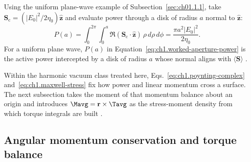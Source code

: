 Using the uniform plane-wave example of Subsection~\ref{sec:ch01.1.1}, take $\mathbf{S}_\mathrm{c}=(|E_0|^2/2\eta_0)\hat{\mathbf{z}}$
and evaluate power through a disk of radius $a$ normal to $\hat{\mathbf{z}}$:
\begin{equation}
\label{eq:ch1.worked-aperture-power}
P(a)=\int_0^{2\pi}\!\!\int_0^a \Re(\mathbf{S}_\mathrm{c}\cdot\hat{\mathbf{z}})\,\rho\,d\rho\,d\phi
=\frac{\pi a^2 |E_0|^2}{2\eta_0}.
\end{equation}
For a uniform plane wave, $P(a)$ in Equation~\eqref{eq:ch1.worked-aperture-power} is the active power intercepted by a disk of radius $a$ whose normal aligns with $\langle\mathbf{S}\rangle$ \cite{poynting1884}.

Within the harmonic vacuum class treated here, Eqs.~\eqref{eq:ch1.poynting-complex} and~\eqref{eq:ch1.maxwell-stress} fix how power and linear momentum cross a surface. The next subsection takes the moment of that momentum balance about an origin and introduces $\Mavg=\mathbf{r}\times\Tavg$ as the stress-moment density from which torque integrals are built \cite{stratton1941}.

\subsection{Angular momentum conservation and torque balance}
\label{sec:ch01.1.5}

